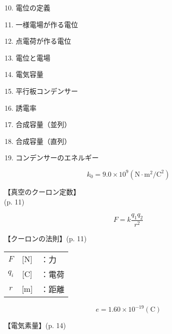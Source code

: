 \documentclass[10pt]{jarticle}
\begin{document}
\newpage
\addtocounter{page}{-1}
\thispagestyle{empty}

\vspace*{-10mm}
\begin{enumerate}
\setcounter{enumi}{9}
\small
\itemsep-4mm
\item 電位の定義 \\
\item 一様電場が作る電位 \\
\item 点電荷が作る電位 \\
\item 電位と電場 \\
\item 電気容量 \\
\item 平行板コンデンサー \\
\item 誘電率 \\
\item 合成容量（並列） \\
\item 合成容量（直列） \\
\item コンデンサーのエネルギー \\
\end{enumerate}




\newpage
\[
	k_0 = 9.0 \! \times \! 10^9  \mathrm{(N \! \cdot \! m^2/C^2)}
\]


\vskip3mm
【真空のクーロン定数】\\
\hfill {\footnotesize (p. 11)}





\newpage
\[
F = k \frac{q_1 q_2}{r^2}
\]


\vskip3mm
【クーロンの法則】{\footnotesize (p. 11)}

\begin{tabular}{ccl}
$F$	&[N]	&：力 \\
$q_i$	&[C]	&：電荷 \\
$r$	&[m]	&：距離
\end{tabular}




\newpage
\[
e = 1.60 \! \times \! 10^{-19} \mathrm{(C)}
\]


\vskip3mm
【電気素量】{\footnotesize (p. 14)}
\end{document}
